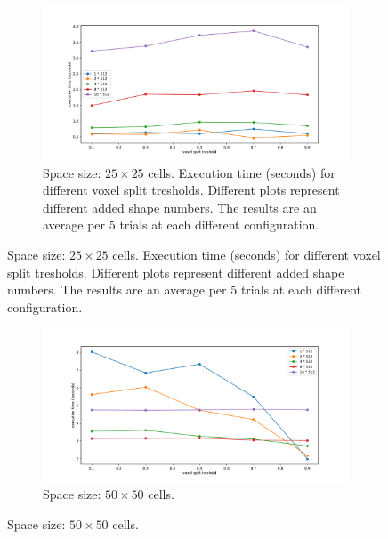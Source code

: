 \documentclass[12pt, oneside]{report}
\begin{document}
\begin{figure}[H]

\begin{subfigure}[b]{\linewidth}
  \centering
	\includegraphics[width=\linewidth,keepaspectratio]{Images/SummaryOptimisation/results_25.pdf}
	\caption{Space size: $25 \times 25$ cells. Execution time (seconds) for different voxel split tresholds. Different plots represent different added shape numbers. The results are an average per 5 trials at each different configuration.}
	\label{summary_res25}
\end{subfigure}

\end{figure}
\begin{figure}[H]\ContinuedFloat

\begin{subfigure}[b]{\linewidth}
  \centering
	\includegraphics[width=\linewidth,keepaspectratio]{Images/SummaryOptimisation/results_50.pdf}
	\caption{Space size: $50 \times 50$ cells.}
	\label{summary_res50}
\end{subfigure}

\end{figure}
\end{document}
